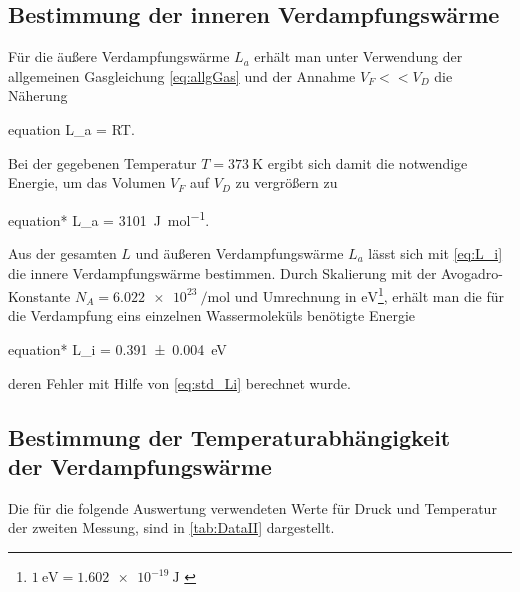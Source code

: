 	\subsection{Bestimmung der inneren Verdampfungswärme}
	\label{sec:innereVerdampfungswärme}
	Für die äußere Verdampfungswärme $L_{a}$ erhält man unter Verwendung der allgemeinen
	Gasgleichung \eqref{eq:allgGas} und der Annahme $V_{F} << V_{D} $ die Näherung
	\begin{empheq}{equation}
	 	\label{eq:L_a}
	 	L_{a} = RT.
	\end{empheq}
	Bei der gegebenen Temperatur $T = \SI{373}{\kelvin}$ ergibt sich damit die notwendige 
	Energie, um das Volumen $V_{F}$ auf $V_{D}$ zu vergrößern zu
	\begin{empheq}{equation*}
		 	L_{a} =  \SI{3101}{\joule\per\mole}\;.
    \end{empheq}  
	Aus der gesamten $L$ und  äußeren Verdampfungswärme $L_{a}$ lässt sich mit \eqref{eq:L_i}
	die innere Verdampfungswärme bestimmen. Durch Skalierung mit der Avogadro-Konstante 
	$N_{A} = \SI{6.022e23}{\per\mole}$ \cite{SciPy} und Umrechnung in $\si{\eV}$\footnote{$\SI{1}{\eV} = \SI{1.602e-19}{\joule}$ \cite{SciPy}},
	erhält man die für die Verdampfung eins einzelnen Wassermoleküls benötigte Energie
	\begin{empheq}{equation*}
			 	L_{i} =  \SI{0.391(4)}{\eV}\;
	\end{empheq} 
	deren Fehler mit Hilfe von \eqref{eq:std_Li} berechnet wurde.
	
\subsection{Bestimmung der Temperaturabhängigkeit\\ der Verdampfungswärme}
\label{sec:Auswertung_TempAbhängigkeit}
	Die für die folgende Auswertung verwendeten Werte für Druck und Temperatur der zweiten Messung, sind in
	\autoref{tab:DataII} dargestellt. 
	
